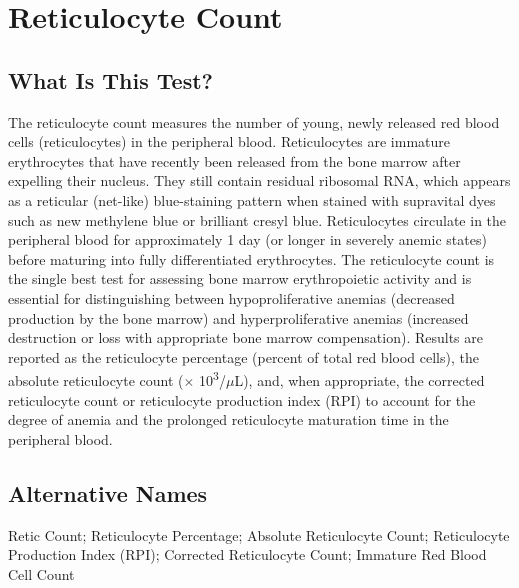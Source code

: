 \chapter{Reticulocyte Count}

\section*{What Is This Test?}
The reticulocyte count measures the number of young, newly released red blood cells (reticulocytes) in the peripheral blood. Reticulocytes are immature erythrocytes that have recently been released from the bone marrow after expelling their nucleus. They still contain residual ribosomal RNA, which appears as a reticular (net-like) blue-staining pattern when stained with supravital dyes such as new methylene blue or brilliant cresyl blue. Reticulocytes circulate in the peripheral blood for approximately 1 day (or longer in severely anemic states) before maturing into fully differentiated erythrocytes. The reticulocyte count is the single best test for assessing bone marrow erythropoietic activity and is essential for distinguishing between hypoproliferative anemias (decreased production by the bone marrow) and hyperproliferative anemias (increased destruction or loss with appropriate bone marrow compensation). Results are reported as the reticulocyte percentage (percent of total red blood cells), the absolute reticulocyte count ($\times$ 10\textsuperscript{3}/$\mu$L), and, when appropriate, the corrected reticulocyte count or reticulocyte production index (RPI) to account for the degree of anemia and the prolonged reticulocyte maturation time in the peripheral blood.

\section*{Alternative Names}
Retic Count; Reticulocyte Percentage; Absolute Reticulocyte Count; Reticulocyte Production Index (RPI); Corrected Reticulocyte Count; Immature Red Blood Cell Count

